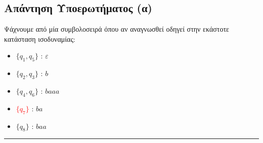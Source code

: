 \subsection{Απάντηση Υποερωτήματος (α)}
\label{ssec:Solution_2.1}
\doublespacing
Ψάχνουμε από μία συμβολοσειρά όπου αν αναγνωσθεί οδηγεί στην εκάστοτε κατάσταση ισοδυναμίας:

\begin{tcolorbox}[colback=yellow!15!white, colframe=blue!50!white,
	fonttitle=\bfseries\Large, title = Αντιπροσοπευτικό στοιχείο για έκαστη κλάση της
	$\approx\mathcal{L}(M)$]

	\centering

	\begin{multicols}{3}
		\begin{itemize}
		\itemsep0em
			\item \textcolor[RGB]{0,100,0}{$\{q_{1}, q_{5}\}$} : $ε$
			\item $\{q_{2}, q_{3}\}$ : $b$
			\item $\{q_{4}, q_{6}\}$ : $baaa$
			\item \textcolor{red}{$\{q_{7}\}$} : $ba$
			\item $\{q_{8}\}$ : $baa$
		\end{itemize}
	\end{multicols}


\end{tcolorbox}
\reducevspace\reducevspace\reducevspace\reducevspace\reducevspace\reducevspace\reducevspace\reducevspace
\begin{center}
	\noindent\rule{\linewidth}{0.5pt}
\end{center}
\clearpage
